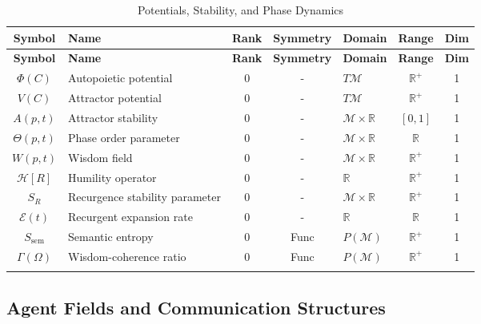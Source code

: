 {\small
\renewcommand{\arraystretch}{1.1}
\begin{longtable}{|c|p{5.5cm}|c|c|p{1.8cm}|c|c|}
\hline
\textbf{Symbol} & \textbf{Name} & \textbf{Rank} & \textbf{Symmetry} & \textbf{Domain} & \textbf{Range} & \textbf{Dim} \\
\hline
\endfirsthead
\hline
\textbf{Symbol} & \textbf{Name} & \textbf{Rank} & \textbf{Symmetry} & \textbf{Domain} & \textbf{Range} & \textbf{Dim} \\
\hline
\endhead
\(\Phi(C)\) & Autopoietic potential & 0 & - & \(T\mathcal{M}\) & \(\mathbb{R}^+\) & 1 \\
\hline
\(V(C)\) & Attractor potential\footnotemark[1] & 0 & - & \(T\mathcal{M}\) & \(\mathbb{R}^+\) & 1 \\
\hline
\(A(p,t)\) & Attractor stability\footnotemark[1] & 0 & - & \(\mathcal{M} \times \mathbb{R}\) & \([0,1]\) & 1 \\
\hline
\(\Theta(p,t)\) & Phase order parameter & 0 & - & \(\mathcal{M} \times \mathbb{R}\) & \(\mathbb{R}\) & 1 \\
\hline
\(W(p,t)\) & Wisdom field & 0 & - & \(\mathcal{M} \times \mathbb{R}\) & \(\mathbb{R}^+\) & 1 \\
\hline
\(\mathcal{H}[R]\) & Humility operator & 0 & - & \(\mathbb{R}\) & \(\mathbb{R}^+\) & 1 \\
\hline
\(S_R\) & Recurgence stability parameter & 0 & - & \(\mathcal{M} \times \mathbb{R}\) & \(\mathbb{R}^+\) & 1 \\
\hline
\(\mathcal{E}(t)\) & Recurgent expansion rate & 0 & - & \(\mathbb{R}\) & \(\mathbb{R}\) & 1 \\
\hline
\(S_{\text{sem}}\) & Semantic entropy & 0 & Func & \(P(\mathcal{M})\) & \(\mathbb{R}^+\) & 1 \\
\hline
\(\Gamma(\Omega)\) & Wisdom-coherence ratio & 0 & Func & \(P(\mathcal{M})\) & \(\mathbb{R}^+\) & 1 \\
\hline
\caption{Potentials, Stability, and Phase Dynamics}
\end{longtable}
}


\subsection{Agent Fields and Communication Structures}
\label{2.2.6:agent_fields_and_communication_structures}

